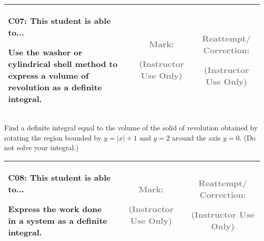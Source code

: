 \documentclass[12pt]{article}
\newcommand{\standardQuestion}[2]{
\newpage
\begin{center}
  \begin{tabular}{|l|c|c|}
  \hline
    \parbox{4in}{
      \textbf{#1}: This student is able to...\\
      #2
    }
  &
    \parbox{1in}{
      \vspace{0.1in}
      \footnotesize \textcolor{gray}{Mark:}
      \vspace{0.7in}

      \tiny \textcolor{gray}{(Instructor Use Only)}
    }
  &
    \parbox{1in}{
      \vspace{0.1in}
      \footnotesize \textcolor{gray}{Reattempt/ Correction:}
      \vspace{0.53in}

      \tiny \textcolor{gray}{(Instructor Use Only)}
    }
  \\\hline
  \end{tabular}
\end{center}
}
\begin{document}
%
%
%
%
%
%
%
%
%
%
%



\standardQuestion{C07}{
  Use the washer or cylindrical shell method to express a volume of
  revolution as a definite integral.
}

Find a definite integral equal to the volume of
the solid of revolution obtained by rotating
the region bounded by \(y=|x|+1\) and \(y=2\) around the
axis \(y=0\).
(Do not solve your integral.)




\standardQuestion{C08}{
  Express the work done in a system as a definite integral.
}
\end{document}
